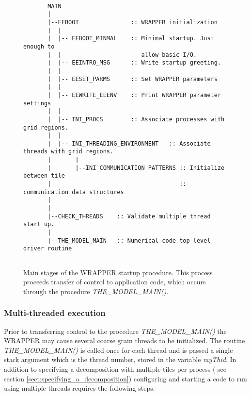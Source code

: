 \begin{figure}
{\footnotesize
\begin{verbatim}

       MAIN  
       |
       |--EEBOOT               :: WRAPPER initialization
       |  |
       |  |-- EEBOOT_MINMAL    :: Minimal startup. Just enough to
       |  |                       allow basic I/O.
       |  |-- EEINTRO_MSG      :: Write startup greeting.
       |  |
       |  |-- EESET_PARMS      :: Set WRAPPER parameters
       |  |
       |  |-- EEWRITE_EEENV    :: Print WRAPPER parameter settings
       |  |
       |  |-- INI_PROCS        :: Associate processes with grid regions.
       |  |
       |  |-- INI_THREADING_ENVIRONMENT   :: Associate threads with grid regions.
       |       |
       |       |--INI_COMMUNICATION_PATTERNS :: Initialize between tile 
       |                                     :: communication data structures
       |
       |
       |--CHECK_THREADS    :: Validate multiple thread start up.
       |
       |--THE_MODEL_MAIN   :: Numerical code top-level driver routine


\end{verbatim}
}
\caption{Main stages of the WRAPPER startup procedure.
This process proceeds transfer of control to application code, which
occurs through the procedure {\em THE\_MODEL\_MAIN()}.
} \label{fig:wrapper_startup}
\end{figure}

\subsubsection{Multi-threaded execution}
\label{sect:multi-threaded-execution}
Prior to transferring control to the procedure {\em THE\_MODEL\_MAIN()} the
WRAPPER may cause several coarse grain threads to be initialized. The routine
{\em THE\_MODEL\_MAIN()} is called once for each thread and is passed a single
stack argument which is the thread number, stored in the
variable {\em myThid}. In addition to specifying a decomposition with
multiple tiles per process ( see section \ref{sect:specifying_a_decomposition}) 
configuring and starting a code to run using multiple threads requires the following
steps.\\

